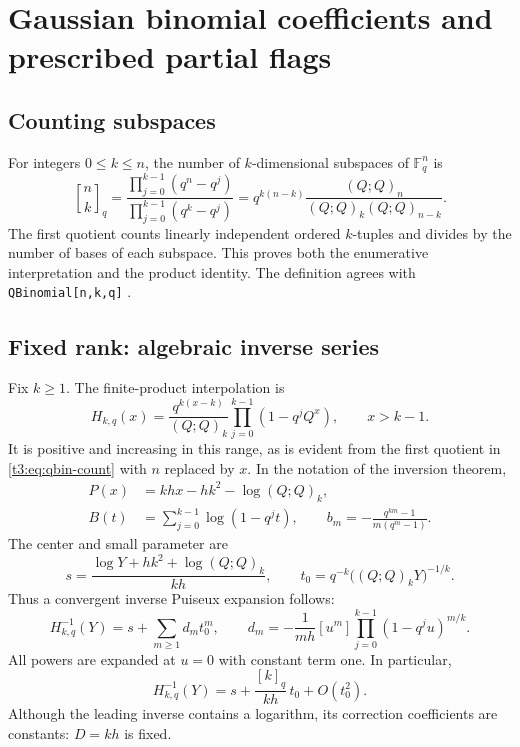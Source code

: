 \documentclass[11pt,openany]{book}
\numberwithin{equation}{chapter}
\theoremstyle{plain}
\theoremstyle{definition}
\theoremstyle{remark}
\newcommand{\F}{\mathbb F}
\newcommand{\coefB}[2]{[#1^{#2}]}             %
\newcommand{\qbinq}[2]{\genfrac{[}{]}{0pt}{}{#1}{#2}_{q}}   %
\newcommand{\pp}[1]{(Q;Q)_{#1}}
\begin{document}
\chapter{Gaussian binomial coefficients and prescribed partial flags}
\label{ct:ch:gaussian}

\label{t3:sec:gaussian}

\section{Counting subspaces}

For integers $0\le k\le n$, the number of $k$-dimensional subspaces of $\F_q^n$ is
\begin{equation}\label{t3:eq:qbin-count}
 \qbinq{n}{k}
 =\frac{\prod_{j=0}^{k-1}(q^n-q^j)}
        {\prod_{j=0}^{k-1}(q^k-q^j)}
 =q^{k(n-k)}\frac{\pp{n}}{\pp{k}\pp{n-k}}.
\end{equation}
The first quotient counts linearly independent ordered $k$-tuples and divides by the number of bases of each subspace. This proves both the enumerative interpretation and the product identity. The definition agrees with \texttt{QBinomial[n,k,q]} \cite{wlqbinomial}.

\section{Fixed rank: algebraic inverse series}
\label{t3:sec:fixedrank}

Fix $k\ge1$. The finite-product interpolation is
\begin{equation}\label{t3:eq:fixedrank-interp}
 H_{k,q}(x)=\frac{q^{k(x-k)}}{\pp{k}}
              \prod_{j=0}^{k-1}(1-q^jQ^x),\qquad x>k-1.
\end{equation}
It is positive and increasing in this range, as is evident from the first quotient in \eqref{t3:eq:qbin-count} with $n$ replaced by $x$. In the notation of the inversion theorem,
\begin{align}
 P(x)&=khx-hk^2-\log\pp{k},\label{t3:eq:fixedrank-phase}\\
 B(t)&=\sum_{j=0}^{k-1}\log(1-q^jt),\qquad
 b_m=-\frac{q^{km}-1}{m(q^m-1)}.\label{t3:eq:fixedrank-tail}
\end{align}
The center and small parameter are
\begin{equation}\label{t3:eq:fixedrank-center}
 s=\frac{\log Y+hk^2+\log\pp{k}}{kh},
 \qquad t_0=q^{-k}\bigl(\pp{k}Y\bigr)^{-1/k}.
\end{equation}
Thus a convergent inverse Puiseux expansion follows:
\begin{equation}\label{t3:eq:fixedrank-inverse}
 H_{k,q}^{-1}(Y)
 =s+\sum_{m\ge1}d_m t_0^m,
 \qquad
 d_m=-\frac1{mh}\coefB{u}{m}
       \prod_{j=0}^{k-1}(1-q^ju)^{m/k}.
\end{equation}
All powers are expanded at $u=0$ with constant term one. In particular,
\begin{equation}\label{t3:eq:fixedrank-first}
 H_{k,q}^{-1}(Y)=s+\frac{[k]_q}{kh}\,t_0+O(t_0^2).
\end{equation}
Although the leading inverse contains a logarithm, its correction coefficients are constants: $D=kh$ is fixed.
\end{document}

